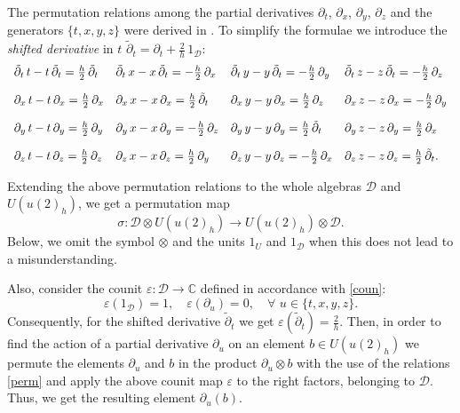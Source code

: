 \documentclass[10pt,a4paper]{amsart}
\newcommand{\pa}{\partial}
\newcommand{\ot}{\otimes}
\newcommand{\C}{\mathbb{C}}
\newcommand{\DD}{\mathcal{D}}
\newcommand{\tpa}{\widetilde{\pa}}
\numberwithin{equation}{section}
\begin{document}
The permutation relations among the partial derivatives $\partial_t$, $\partial_x$, $\partial_y$, $\partial_z$ and the
generators $\{t,x,y, z\}$ were derived in \cite{GPS2}. To simplify the formulae we introduce the {\em shifted derivative} in $t$
$\tilde \partial_t = \partial_t +\frac{2}{h}\,1_{\DD}$:
\begin{equation}
\begin{array}{l@{\quad}l@{\quad}l@{\quad}l}
	\tilde\pa_t\,t - t\,\tilde\pa_t = \frac{h}{2}\,\tilde\pa_t & \tilde\pa_t\, x - x\,\tilde\pa_t
	=-\frac{h}{2}\,\pa_x &
	\tilde\pa_t\, y - y\, \tilde\pa_t=-\frac{h}{2}\,\pa_y &\tilde\pa_t\, z - z\,\tilde\pa_t=- \frac{h}{2}\,\pa_z\\
	\rule{0pt}{7mm}
	\pa_x\, t - t\,\pa_x = \frac{h}{2}\,\pa_x &\pa_x \,x -  x\,\pa_x = \frac{h}{2}\,\tilde\pa_t &
	\pa_x \, y-  y\,\pa_x = \frac{h}{2}\,\pa_z & \pa_x \,z - z\, \pa_x  = - \frac{h}{2}\,\pa_y \\
	\rule{0pt}{7mm}
	\pa_y \,t - t \, \pa_y = \frac{h}{2}\,\pa_y & \pa_y \,x -  x\,  \pa_y = -\frac{h}{2}\,\pa_z &
	\pa_y \,y - y \,  \pa_y = \frac{h}{2}\,\tilde\pa_t & \pa_y \,z - z \,  \pa_ y= \frac{h}{2}\,\pa_x\\
	\rule{0pt}{7mm}
	\pa_z \,t - t \,\pa_z = \frac{h}{2}\,\pa_z & \pa_z \,x - x \,\pa_z = \frac{h}{2}\,\pa_y&
	\pa_z \,y -  y\,\pa_z = -\frac{h}{2}\,\pa_x & \pa_z \,z - z \,\pa_z = \frac{h}{2}\,\tilde\pa_t.
\end{array}
\label{perm}
\end{equation}

Extending the above permutation relations to the whole algebras $\DD$ and $U(u(2)_h)$, we get a permutation map
\[\sigma: {\DD}\ot U(u(2)_h)\to U(u(2)_h)\ot {\DD}   \label{map}.\]
Below,  we omit the symbol $\ot$ and the units $1_{U}$ and $1_{\DD}$  when this does not lead to a misunderstanding.

Also, consider the counit $\varepsilon:\DD\to \C$ defined in accordance with \eqref{coun}:
\begin{equation}
\varepsilon(1_{\DD})=1, \quad \varepsilon(\pa_u)=0,\quad \forall\,\, u\in \{t,x,y,z\}.
\label{counn}
\end{equation}
Consequently, for the shifted derivative $\tilde\partial_t$ we get $\varepsilon(\tpa_t)=\frac{2}{h}$.
Then, in order to find the action of a partial derivative $\pa_u$ on an element $b\in  U(u(2)_h)$ we permute the elements
$\pa_u$ and $b$ in the product
$\pa_u\ot b$ with the use of the relations \eqref{perm} and apply the above counit map $\varepsilon$ to the right factors,
belonging to $\DD$. Thus, we get the resulting
element $\pa_u(b)$.
\end{document}
